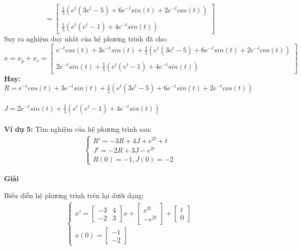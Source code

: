 $$=
\begin{bmatrix}
    \frac{1}{5}(e^{t}(3e^t-5)+6e^{-t}sin(t)+2e^{-t}cos(t)) \\\\
    \frac{1}{5}(e^{t}(e^t-1)+4e^{-t}sin(t))
\end{bmatrix}
$$
Suy ra nghiệm duy nhất của hệ phương trình đã cho:
$$x=x_p+x_c=
\begin{bmatrix}
    e^{-t}cos(t)+3e^{-t}sin(t)+\frac{1}{5}(e^{t}(3e^t-5)+6e^{-t}sin(t)+2e^{-t}cos(t))\\\\
    2e^{-t}sin(t)+\frac{1}{5}(e^{t}(e^t-1)+4e^{-t}sin(t))
\end{bmatrix}
$$
\textbf{Hay:}\\
\hspace*{3cm}$R=e^{-t}cos(t)+3e^{-t}sin(t)+\frac{1}{5}(e^{t}(3e^t-5)+6e^{-t}sin(t)+2e^{-t}cos(t))$\\\\
\hspace*{3cm}$J=2e^{-t}sin(t)+\frac{1}{5}(e^{t}(e^t-1)+4e^{-t}sin(t))$\\\\
\textbf{Ví dụ 5:} Tìm nghiệm của hệ phương trình sau:
\begin{align*}
    \begin{cases}
        R'=-3R+4J+e^{2t}+t \\
        J'=-2R+3J-e^{2t} \\
        R(0)=-1, J(0)=-2
    \end{cases}
\end{align*}
\centerline{\textbf{Giải}}
Biểu diễn hệ phương trình trên lại dưới dạng:
\begin{align*}
    \begin{cases}
        x'=
        \begin{bmatrix}
        -3 & 4\\
        -2 & 3
        \end{bmatrix}
        x+
        \begin{bmatrix}
        e^{2t}\\
        -e^{2t}
        \end{bmatrix}
        +\begin{bmatrix}
        t\\
        0
        \end{bmatrix}
        \\
        x(0)=\begin{bmatrix}
        -1\\
        -2
        \end{bmatrix}
    \end{cases}
\end{align*}
